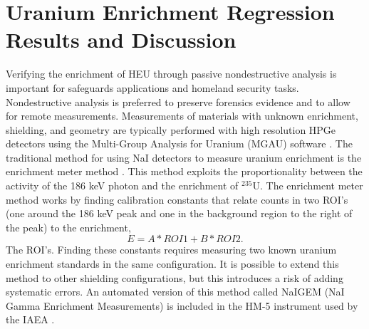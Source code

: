 \chapter{Uranium Enrichment Regression Results and Discussion}





Verifying the enrichment of HEU through passive nondestructive analysis is important for safeguards applications and homeland security tasks. Nondestructive analysis is preferred to preserve forensics evidence and to allow for remote measurements. Measurements of materials with unknown enrichment, shielding, and geometry are typically performed with high resolution HPGe detectors using the Multi-Group Analysis for Uranium (MGAU) software \cite{MGAU1994}. The traditional method for using NaI detectors to measure uranium enrichment is the enrichment meter method \cite{Reilly1970}. This method exploits the proportionality between the activity of the 186 keV photon and the enrichment of $^{235}$U. The enrichment meter method works by finding calibration constants that relate counts in two ROI's (one around the 186 keV peak and one in the background region to the right of the peak) to the enrichment,
%
\begin{equation} \label{eq:enrichment_meter_principle}
E = A * ROI1 + B * ROI2.
\end{equation}
%
The ROI's. Finding these constants requires measuring two known uranium enrichment standards in the same configuration. It is possible to extend this method to other shielding configurations, but this introduces a risk of adding systematic errors. An automated version of this method called NaIGEM (NaI Gamma Enrichment Measurements) is included in the HM-5 instrument used by the IAEA \cite{MORTREAU2004}.




